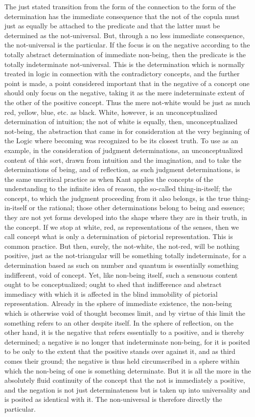 The just stated transition from
the form of the connection
to the form of the determination
has the immediate consequence
that the not of the copula
must just as equally be attached to the predicate
and that the latter must be determined as the not-universal.
But, through a no less immediate consequence,
the not-universal is the particular.
If the focus is on the negative
according to the totally abstract
determination of immediate non-being,
then the predicate is the
totally indeterminate not-universal.
This is the determination which is normally treated in logic
in connection with the contradictory concepts,
and the further point is made,
a point considered important
that in the negative of a concept
one should only focus on the negative,
taking it as the mere indeterminate extent
of the other of the positive concept.
Thus the mere not-white would be
just as much red, yellow, blue, etc. as black.
White, however, is an unconceptualized determination of intuition;
the not of white is equally, then, unconceptualized not-being,
the abstraction that came in for consideration
at the very beginning of the Logic
where becoming was recognized to be its closest truth.
To use as an example,
in the consideration of judgment determinations,
an unconceptualized content of this sort,
drawn from intuition and the imagination,
and to take the determinations of being, and of reflection,
as such judgment determinations,
is the same uncritical practice as
when Kant applies the concepts of the understanding
to the infinite idea of reason, the so-called thing-in-itself;
the concept, to which the judgment proceeding from it also
belongs, is the true thing-in-itself or the rational;
those other determinations belong to being and essence;
they are not yet forms developed into the shape
where they are in their truth, in the concept.
If we stop at white, red, as representations of the senses,
then we call concept what is only a
determination of pictorial representation.
This is common practice.
But then, surely, the not-white, the not-red,
will be nothing positive,
just as the not-triangular will be
something totally indeterminate,
for a determination based as such on number and quantum is
essentially something indifferent, void of concept.
Yet, like non-being itself, such a sensuous content
ought to be conceptualized;
ought to shed that indifference and abstract immediacy
with which it is affected in the blind immobility
of pictorial representation.
Already in the sphere of immediate existence,
the non-being which is otherwise void of thought becomes limit,
and by virtue of this limit
the something refers to an other despite itself.
In the sphere of reflection, on the other hand,
it is the negative that refers essentially to a positive,
and is thereby determined;
a negative is no longer that indeterminate non-being,
for it is posited to be only to the extent
that the positive stands over against it,
and as third comes their ground;
the negative is thus held circumscribed in a sphere
within which the non-being of one is something determinate.
But it is all the more in the absolutely
fluid continuity of the concept
that the not is immediately a positive,
and the negation is not just determinateness
but is taken up into universality
and is posited as identical with it.
The non-universal is therefore directly the particular.

